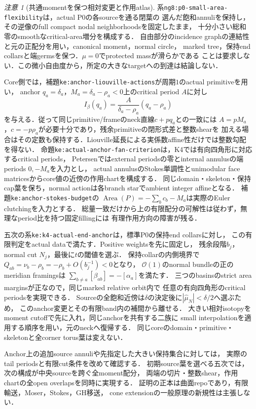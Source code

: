 \documentclass[a4paper,11pt]{ltjsarticle}
\numberwithin{equation}{section}
\theoremstyle{plain}
\theoremstyle{definition}
\theoremstyle{remark}
\newtheorem{remark}[theorem]{注意}
\begin{document}
\begin{remark}[共通momentを保つ相対変更と作用atlas]
系\texttt{ng8:p0-small-area-flexibility}は，actual P0の各sourceを通る閉葉の
選んだ飽和annuliを保持し，その逆像のfull compact nodal neighborhoodsを固定したまま，
十分小さい総和零のsmoothなcritical-area増分を構成する．
自由部分のincidence graphの連結性と元の正配分を用い，canonical moment，normal circle，
marked tree，保持end collarsと端germsを保つ．\(\mu=0\)でprotected massが滑らかである
ことは要求しない．この微小自由度から，所定の大きなtargetへの到達は結論しない．

Core側では，補題\texttt{ke:anchor-liouville-actions}が周期\(1\)のactual primitiveを用い，
anchor \(q_a=\delta_a\)，\(M_a=\delta_a-\rho_a<0\)上のcritical period \(A\)に対し
\[
 I_\beta(q_a)=\frac{A}{\delta_a-\rho_a}(q_a-\rho_a)
\]
を与える．従って同じprimitive/frameのneck直線\(c+pq_a\)との一致には
\(A=pM_a\)，\(c=-p\rho_a\)が必要十分であり，残余primitiveの閉形式差と整数shearを
加える場合はその定数も保持する．Liouville延長による実係数affine性だけでは整数勾配を得ない．
命題\texttt{ke:actual-anchor-fan-criterion}は，K4では有向四角形に対応するcritical periods，
Petersenではexternal periodsの零とinternal annulusの端periods \(0,-M_a\)を入力とし，
actual annulusのStokes単調性とunimodular face matricesからcore値の近傍の作用chartを構成する．
同じdomain・skeleton・保持cap葉を保ち，normal actionは各branch starでambient integer affineとなる．
補題\texttt{ke:anchor-stokes-budget}の
\(\operatorname{Area}(P)=-\sum_b c_b-M_a\)は実際のEuler clutchingを入力とする．
総量一致だけから上の有限配分の可解性は従わず，無理なperiod比を持つ固定fillingには
有理作用方向の障害が残る．

五次の系\texttt{ke:k4-actual-end-anchor}は，標準P0の保持end collarsに対し，
この有限判定をactual dataで満たす．Positive weightsを先に固定し，
残余段階$b_j$，normal cut $N_j$，最後に$t$の閾値を選ぶ．
保持collarの内側境界で$Q_{ab}=\nu_b-\rho_b=-\rho_b+O(b_j^{-1})<0$となり，
$\mathcal O(1)$のnormal bundleの正のmeridian framingsは
$\sum_{b\ne a}[\beta_{ab}]=-[\alpha_a]$を満たす．
三つのbasinsのstrict area marginsが正なので，同じmarked relative orbit内で
任意の有向四角形のcritical periodsを実現できる．
Sourceの全飽和近傍は$\delta$の決定後に$|\widehat\mu_N|<\delta/2$へ選ぶため，
このanchor変更とその有限band内の補間から離せる．
大きい相対isotopyをmoment cutoffで先に入れ，同じanchorを共有する二族に
small interpolationを適用する順序を用い，元のneckへ復帰する．
同じcoreのdomain・primitive・skeletonと全corner torus葉は変えない．

Anchor上の追加source annuliや先指定した大きい保持集合に対しては，
実際のtail periodsと有限cut条件を改めて確認する．
初期source葉を選べる五次では，次の構成が中央sourceを跨ぐ全moment配分，
両端の切片・整数shear，作用chartの全open overlapsを同時に実現する．
証明の正本は曲面repoであり\cite{SurfaceKE}，有限輸送，Moser，Stokes，GH移送，
cone extensionの一般原理の新規性は主張しない．
\end{remark}
\end{document}
